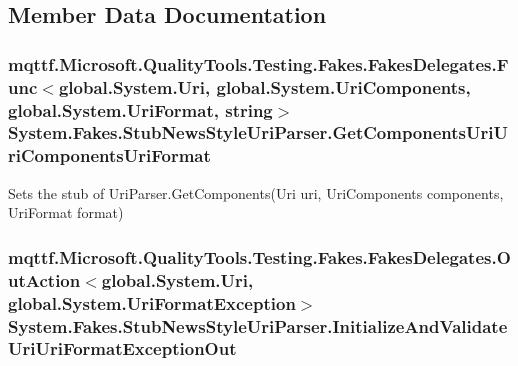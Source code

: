 \subsection{Member Data Documentation}
\hypertarget{class_system_1_1_fakes_1_1_stub_news_style_uri_parser_ae7f9719664a69a07500feb2e73fa99c9}{
\subsubsection[{Get\-Components\-Uri\-Uri\-Components\-Uri\-Format}]{\setlength{\rightskip}{0pt plus 5cm}mqttf.\-Microsoft.\-Quality\-Tools.\-Testing.\-Fakes.\-Fakes\-Delegates.\-Func$<$global.\-System.\-Uri, global.\-System.\-Uri\-Components, global.\-System.\-Uri\-Format, string$>$ System.\-Fakes.\-Stub\-News\-Style\-Uri\-Parser.\-Get\-Components\-Uri\-Uri\-Components\-Uri\-Format}}\label{class_system_1_1_fakes_1_1_stub_news_style_uri_parser_ae7f9719664a69a07500feb2e73fa99c9}


Sets the stub of Uri\-Parser.\-Get\-Components(\-Uri uri, Uri\-Components components, Uri\-Format format)

\hypertarget{class_system_1_1_fakes_1_1_stub_news_style_uri_parser_a82757fc276f0c0c6e896cb75ad73330e}{
\subsubsection[{Initialize\-And\-Validate\-Uri\-Uri\-Format\-Exception\-Out}]{\setlength{\rightskip}{0pt plus 5cm}mqttf.\-Microsoft.\-Quality\-Tools.\-Testing.\-Fakes.\-Fakes\-Delegates.\-Out\-Action$<$global.\-System.\-Uri, global.\-System.\-Uri\-Format\-Exception$>$ System.\-Fakes.\-Stub\-News\-Style\-Uri\-Parser.\-Initialize\-And\-Validate\-Uri\-Uri\-Format\-Exception\-Out}}\label{class_system_1_1_fakes_1_1_stub_news_style_uri_parser_a82757fc276f0c0c6e896cb75ad73330e}


